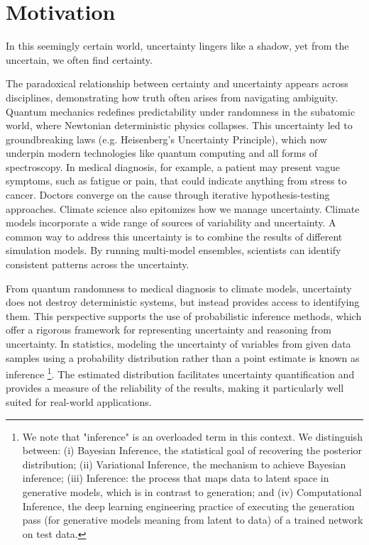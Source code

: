 \section{Motivation} 
\label{sec:introduction:motivation}

\begin{highlightbox}
In this seemingly certain world, uncertainty lingers like a shadow, yet from the uncertain, we often find certainty.       
\end{highlightbox}  

The paradoxical relationship between certainty and uncertainty appears across disciplines, demonstrating how truth often arises from navigating ambiguity. Quantum mechanics redefines predictability under randomness in the subatomic world, where Newtonian deterministic physics collapses. This uncertainty led to groundbreaking laws (e.g. Heisenberg's Uncertainty Principle), which now underpin modern technologies like quantum computing and all forms of spectroscopy. In medical diagnosis, for example, a patient may present vague symptoms, such as fatigue or pain, that could indicate anything from stress to cancer. Doctors converge on the cause through iterative hypothesis-testing approaches. Climate science also epitomizes how we manage uncertainty. Climate models incorporate a wide range of sources of variability and uncertainty. A common way to address this uncertainty is to combine the results of different simulation models. By running multi-model ensembles, scientists can identify consistent patterns across the uncertainty.

From quantum randomness to medical diagnosis to climate models, uncertainty does not destroy deterministic systems, but instead provides access to identifying them. This perspective supports the use of probabilistic inference methods, which offer a rigorous framework for representing uncertainty and reasoning from uncertainty. In statistics, modeling the uncertainty of variables from given data samples using a probability distribution rather than a point estimate is known as inference \footnote{We note that "inference" is an overloaded term in this context. We distinguish between: (i) Bayesian Inference, the statistical goal of recovering the posterior distribution; (ii) Variational Inference, the mechanism to achieve Bayesian inference; (iii) Inference: the process that maps data to latent space in generative models, which is in contrast to generation; and (iv) Computational Inference, the deep learning engineering practice of executing the generation pass (for generative models meaning from latent to data) of a trained network on test data.}. The estimated distribution facilitates uncertainty quantification and provides a measure of the reliability of the results, making it particularly well suited for real-world applications. 


